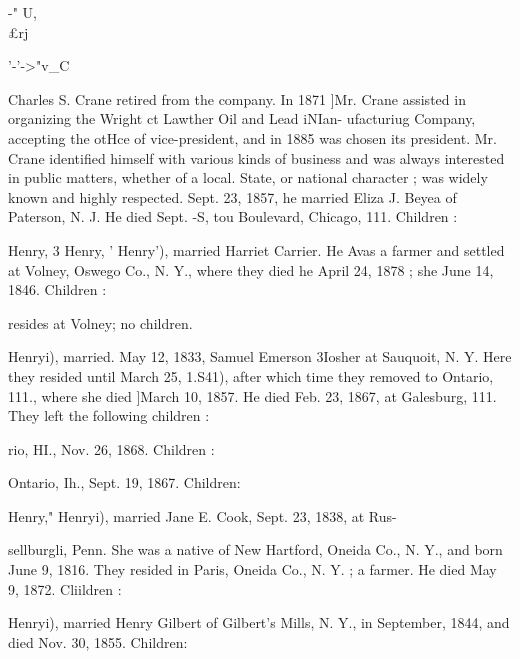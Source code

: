 \documentclass{book}
\begin{document}
-" U, \\£rj 



'-'->"v\_C 




Charles S. Crane retired from the company. In 1871 ]Mr. Crane 
assisted in organizing the Wright ct Lawther Oil and Lead iNIan- 
ufacturiug Company, accepting the otHce of vice-president, and 
in 1885 was chosen its president. Mr. Crane identified himself 
with various kinds of business and was always interested in 
public matters, whether of a local. State, or national character ; 
was widely known and highly respected. Sept. 23, 1857, he 
married Eliza J. Beyea of Paterson, N. J. He died Sept. -S, 
tou Boulevard, Chicago, 111. Children : 



Henry, 3 Henry, ' Henry'), married Harriet Carrier. He Avas a 
farmer and settled at Volney, Oswego Co., N. Y., where they 
died he April 24, 1878 ; she June 14, 1846. Children : 

resides at Volney; no children. 


Henryi), married. May 12, 1833, Samuel Emerson 3Iosher at 
Sauquoit, N. Y. Here they resided until March 25, 1.S41), after 
which time they removed to Ontario, 111., where she died ]March 
10, 1857. He died Feb. 23, 1867, at Galesburg, 111. They left 
the following children : 








rio, HI., Nov. 26, 1868. Children : 






Ontario, Ih., Sept. 19, 1867. Children: 












Henry," Henryi), married Jane E. Cook, Sept. 23, 1838, at Rus- 




sellburgli, Penn. She was a native of New Hartford, Oneida 
Co., N. Y., and born June 9, 1816. They resided in Paris, 
Oneida Co., N. Y. ; a farmer. He died May 9, 1872. Cliildren : 




Henryi), married Henry Gilbert of Gilbert's Mills, N. Y., in 
September, 1844, and died Nov. 30, 1855. Children: 
\end{document}
